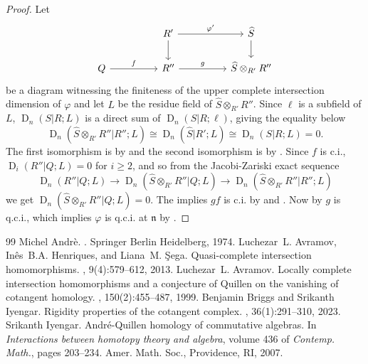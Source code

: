 \documentclass[10pt,a4paper]{amsart}
\newcommand{\daq}[4]{\operatorname{D}_{#1}(#2|#3;#4)}
\newcommand{\n}{\mathfrak{n}}
\begin{document}
\begin{proof}
Let 
\[\begin{tikzcd}
	&& {R'} && {\widehat{S}} \\
	Q && {R''} && {\widehat{S}\otimes_{R'}R''}
	\arrow["{\varphi'}", from=1-3, to=1-5]
	\arrow[from=1-3, to=2-3]
	\arrow[from=1-5, to=2-5]
	\arrow["f", from=2-1, to=2-3]
	\arrow["g", from=2-3, to=2-5]
\end{tikzcd}\]
be a diagram witnessing the finiteness of the upper complete intersection dimension of $\varphi$ and let $L$ be the residue field of $\widehat{S}\otimes_{R'}R''$. Since $\ell$ is a subfield of $L$, $\daq{n}{S}{R}{L}$ is a direct sum of $\daq{n}{S}{R}{\ell}$, giving the equality below
\[\daq{n}{\widehat{S}\otimes_{R'}R''}{R''}{L} \cong \daq{n}{\widehat{S}}{R'}{L} \cong \daq{n}{S}{R}{L} = 0.\]
The first isomorphism is by \cite[6.3]{Iyengar:2007} and the second isomorphism is by \cite[Lemma 1.7]{Avramov:1999}. Since $f$ is c.i., $\daq{i}{R''}{Q}{L}=0$ for $i\geq 2$, and so from the Jacobi-Zariski exact sequence \cite[Theorem 5.1]{Andre:1974}
\[\daq{n}{R''}{Q}{L}\rightarrow \daq{n}{\widehat{S}\otimes_{R'}R''}{Q}{L}\rightarrow \daq{n}{\widehat{S}\otimes_{R'}R''}{R''}{L}\]
we get $\daq{n}{\widehat{S}\otimes_{R'}R''}{Q}{L} = 0$. The implies $gf$ is c.i. by \cite[Theorem A]{Briggs/Iyengar:2020} and \cite[Proposition 4.57]{Andre:1974}. Now by \cite[8.9]{Avramov/Henriques/Sega:2013} $g$ is q.c.i., which implies $\varphi$ is q.c.i. at $\n$ by \cite[8.7]{Avramov/Henriques/Sega:2013}.
\end{proof}

\begin{thebibliography}{99}
 Michel Andrè. . \newblock Springer Berlin Heidelberg, 1974.
 Luchezar~L. Avramov, Inês~B.A. Henriques, and Liana~M. {\c S}ega. \newblock Quasi-complete intersection homomorphisms. , 9(4):579--612, 2013.
 Luchezar~L. Avramov. \newblock Locally complete intersection homomorphisms and a conjecture of {Q}uillen on the vanishing of cotangent homology. , 150(2):455--487, 1999.
 Benjamin Briggs and Srikanth Iyengar. \newblock Rigidity properties of the cotangent complex. , 36(1):291--310, 2023.
 Srikanth Iyengar. \newblock Andr\'{e}-{Q}uillen homology of commutative algebras. \newblock In {\em Interactions between homotopy theory and algebra}, volume 436 of {\em Contemp. Math.}, pages 203--234. Amer. Math. Soc., Providence, RI, 2007.
\end{thebibliography}
\end{document}
